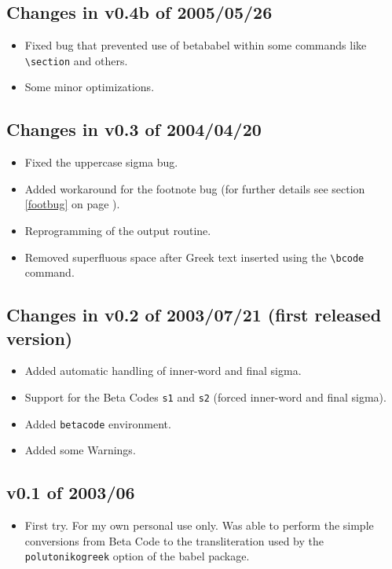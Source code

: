 \documentclass{article}
\begin{document}
\subsection{Changes in v0.4b of 2005/05/26}
\begin{itemize}
\item Fixed bug that prevented use of \textsf{betababel} within some commands like \verb=\section= and others.
\item Some minor optimizations.
\end{itemize}

\subsection{Changes in v0.3 of 2004/04/20}
\begin{itemize}
\item Fixed the uppercase sigma bug.
\item Added workaround for the footnote bug (for further details see section \ref{footbug} on page \pageref{footbug}).
\item Reprogramming of the output routine.
\item Removed superfluous space after Greek text inserted using the \verb=\bcode= command.
\end{itemize}

\subsection{Changes in v0.2 of 2003/07/21 (first released version)}
\begin{itemize}
\item Added automatic handling of inner-word and final sigma.
\item Support for the Beta Codes {\tt s1} and {\tt s2} (forced inner-word and final sigma).
\item Added {\tt betacode} environment.
\item Added some Warnings.
\end{itemize}

\subsection{v0.1 of 2003/06}
\begin{itemize}
\item First try. For my own personal use only. Was able to perform the simple conversions from Beta Code to the transliteration used by the {\tt polutonikogreek} option of the {\sf babel} package.
\end{itemize}
\end{document}
